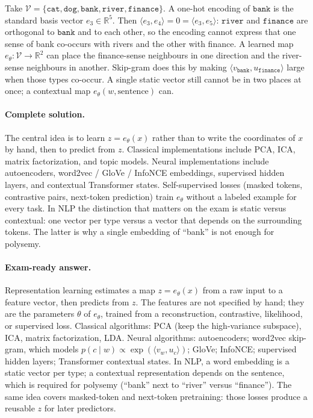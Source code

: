 \documentclass[11pt,a4paper]{article}
\theoremstyle{definition}
\begin{document}
\begin{example}
Take \(\mathcal{V}=\{\texttt{cat},\texttt{dog},\texttt{bank},\texttt{river},\texttt{finance}\}\). A one-hot encoding of \(\texttt{bank}\) is the standard basis vector \(e_3\in\mathbb{R}^5\). Then \(\langle e_3,e_4\rangle=0=\langle e_3,e_5\rangle\): \(\texttt{river}\) and \(\texttt{finance}\) are orthogonal to \(\texttt{bank}\) and to each other, so the encoding cannot express that one sense of bank co-occurs with rivers and the other with finance. A learned map \(e_\theta:\mathcal{V}\to\mathbb{R}^2\) can place the finance-sense neighbours in one direction and the river-sense neighbours in another. Skip-gram does this by making \(\langle v_{\texttt{bank}},u_{\texttt{finance}}\rangle\) large when those types co-occur. A single static vector still cannot be in two places at once; a contextual map \(e_\theta(w,\text{sentence})\) can.
\end{example}

\paragraph{Complete solution.}
The central idea is to learn \(z=e_\theta(x)\) rather than to write the coordinates of \(x\) by hand, then to predict from \(z\). Classical implementations include PCA, ICA, matrix factorization, and topic models. Neural implementations include autoencoders, word2vec / GloVe / InfoNCE embeddings, supervised hidden layers, and contextual Transformer states. Self-supervised losses (masked tokens, contrastive pairs, next-token prediction) train \(e_\theta\) without a labeled example for every task. In NLP the distinction that matters on the exam is static versus contextual: one vector per type versus a vector that depends on the surrounding tokens. The latter is why a single embedding of ``bank'' is not enough for polysemy.

\paragraph{Exam-ready answer.}
Representation learning estimates a map \(z=e_\theta(x)\) from a raw input to a feature vector, then predicts from \(z\). The features are not specified by hand; they are the parameters \(\theta\) of \(e_\theta\), trained from a reconstruction, contrastive, likelihood, or supervised loss. Classical algorithms: PCA (keep the high-variance subspace), ICA, matrix factorization, LDA. Neural algorithms: autoencoders; word2vec skip-gram, which models \(p(c\mid w)\propto\exp(\langle v_w,u_c\rangle)\); GloVe; InfoNCE; supervised hidden layers; Transformer contextual states. In NLP, a word embedding is a static vector per type; a contextual representation depends on the sentence, which is required for polysemy (``bank'' next to ``river'' versus ``finance''). The same idea covers masked-token and next-token pretraining: those losses produce a reusable \(z\) for later predictors.
\end{document}
